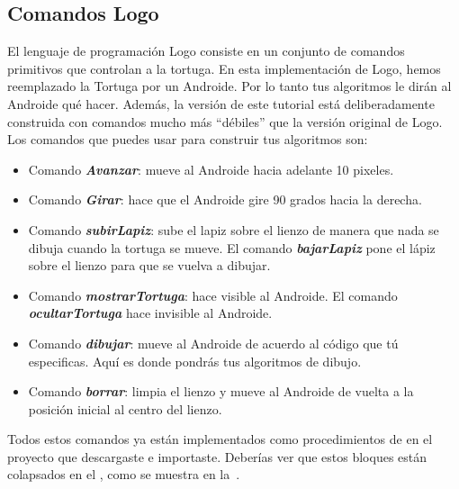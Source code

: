 \subsection*{Comandos Logo}

El lenguaje de programación Logo consiste en un conjunto de comandos
primitivos que controlan a la tortuga. En esta implementación de Logo,
hemos reemplazado la Tortuga por un Androide. Por lo tanto tus
algoritmos le dirán al Androide qué hacer. Además, la versión de este
tutorial está deliberadamente construida con comandos mucho más
``débiles'' que la versión original de Logo. Los comandos que puedes
usar para construir tus algoritmos son:

\newcommand\logoCommand[1]{\textbf{\textit{#1\xspace}}}

\begin{itemize}

\item Comando \logoCommand{Avanzar}: mueve al Androide hacia
  adelante 10 pixeles.

\item Comando \logoCommand{Girar}: hace que el Androide gire 90 grados
  hacia la derecha.

\item Comando \logoCommand{subirLapiz}: sube el lapiz sobre el lienzo
  de manera que nada se dibuja cuando la tortuga se mueve. El comando
  \logoCommand{bajarLapiz} pone el lápiz sobre el lienzo para que se
  vuelva a dibujar.

\item Comando \logoCommand{mostrarTortuga}: hace visible al
  Androide. El comando \logoCommand{ocultarTortuga} hace invisible al
  Androide.

\item Comando \logoCommand{dibujar}: mueve al Androide de acuerdo al
  código que tú especificas. Aquí es donde pondrás tus algoritmos de
  dibujo.

\item Comando \logoCommand{borrar}: limpia el lienzo y mueve al
  Androide de vuelta a la posición inicial al centro del lienzo.

\end{itemize}

Todos estos comandos ya están implementados como procedimientos de
\AppInventor en el proyecto  que descargaste e
importaste. Deberías ver que estos bloques están colapsados en el
\blockEditor, como se muestra en la~.

